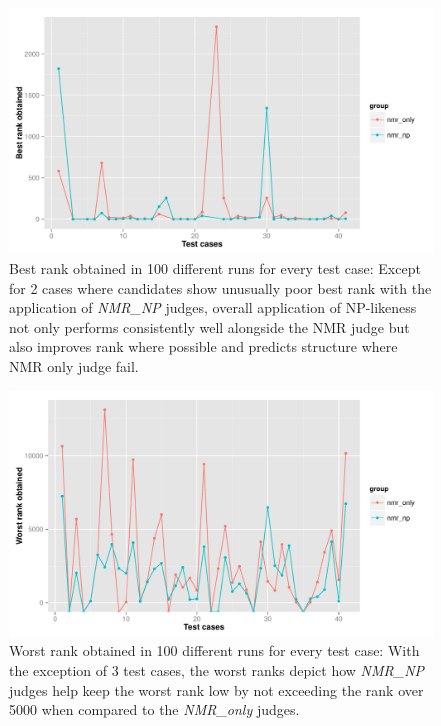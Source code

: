 \documentclass[10pt]{bmc_article}
\newenvironment{bmcformat}{\begin{raggedright}\baselineskip20pt\sloppy\setboolean{publ}{false}}{\end{raggedright}\baselineskip20pt\sloppy}
\begin{document}
\begin{bmcformat}
\begin{figure}[hbt]
  \centering
  	\includegraphics[angle=0,clip=false,scale=0.5]{pics/bestRank.pdf}	
  \caption{Best rank obtained in 100 different runs for every test case: Except for 2 cases where candidates show unusually poor best rank with the application of \emph{NMR\_NP} judges, overall application of NP-likeness not only performs consistently well alongside the NMR judge but also improves rank where possible and predicts structure where NMR only judge fail.}
   
  \label{fig:bestRank}
\end{figure}

\begin{figure}[hbt]
  \centering
  	\includegraphics[angle=0,clip=false,scale=0.5]{pics/worstRank.pdf}
	
  \caption{Worst rank obtained in 100 different runs for every test case: With the exception of 3 test cases, the worst ranks depict how \emph{NMR\_NP} judges help keep the worst rank low by not exceeding the rank over 5000 when compared to the \emph{NMR\_only} judges.}
   

\end{figure}
\end{bmcformat}
\end{document}
